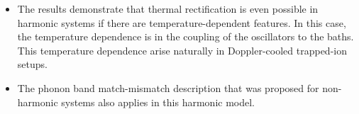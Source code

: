 \begin{itemize}
\begin{itemize}
    \item The results demonstrate that thermal rectification is even possible in
    harmonic systems if there are temperature-dependent features. In this case, the
    temperature dependence is in the coupling of the oscillators to the baths. This
    temperature dependence arise naturally in Doppler-cooled trapped-ion setups.

    \item The phonon band match-mismatch description that was proposed for non-harmonic
    systems also applies in this harmonic model.
  \end{itemize}

\end{itemize}


